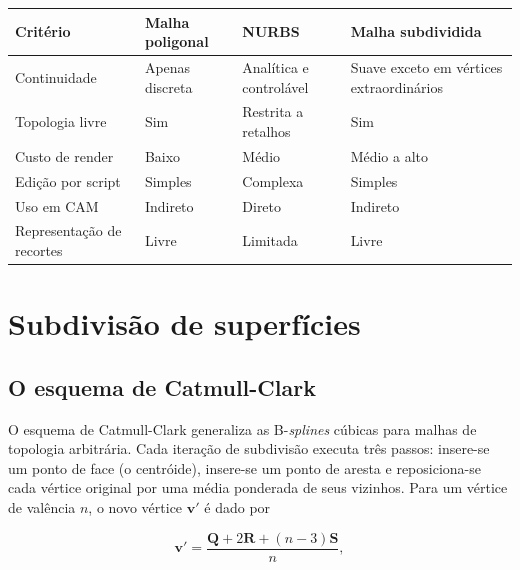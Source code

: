 \begin{quadro}[htbp]
\centering
\caption{Compara\c{c}\~ao entre representa\c{c}\~oes de superf\'icie}
\label{qua:representacoes}
\footnotesize
\begin{tabular}{>{\raggedright\arraybackslash}p{2.9cm}>{\raggedright\arraybackslash}p{3.6cm}>{\raggedright\arraybackslash}p{3.6cm}>{\raggedright\arraybackslash}p{3.6cm}}
\toprule
\textbf{Crit\'erio} & \textbf{Malha poligonal} & \textbf{NURBS} & \textbf{Malha subdividida} \\
\midrule
Continuidade & Apenas discreta & Anal\'itica e control\'avel & Suave exceto em v\'ertices extraordin\'arios \\
Topologia livre & Sim & Restrita a retalhos & Sim \\
Custo de render & Baixo & M\'edio & M\'edio a alto \\
Edi\c{c}\~ao por script & Simples & Complexa & Simples \\
Uso em CAM & Indireto & Direto & Indireto \\
Representa\c{c}\~ao de recortes & Livre & Limitada & Livre \\
\bottomrule
\end{tabular}
\end{quadro}

\section{Subdivis\~ao de superf\'icies}

\subsection{O esquema de Catmull-Clark}

O esquema de Catmull-Clark \cite{catmull1978} generaliza as B-\emph{splines} c\'ubicas para
malhas de topologia arbitr\'aria. Cada itera\c{c}\~ao de subdivis\~ao executa tr\^es passos:
insere-se um ponto de face (o centr\'oide), insere-se um ponto de aresta e reposiciona-se cada
v\'ertice original por uma m\'edia ponderada de seus vizinhos. Para um v\'ertice de val\^encia
$n$, o novo v\'ertice $\mathbf{v}'$ \'e dado por

\begin{equation}
\mathbf{v}' = \frac{\mathbf{Q} + 2\mathbf{R} + (n-3)\mathbf{S}}{n},
\label{eq:catmull-clark}
\end{equation}

